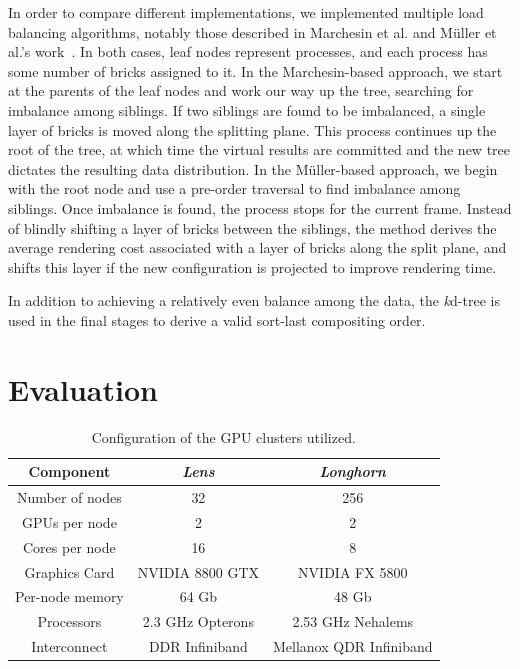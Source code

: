 In order to compare different implementations, we implemented multiple
load balancing algorithms, notably those described in Marchesin et al.
and M\"uller et al.'s work~\cite{Marchesin:2006:DynamicLB,
Mueller:2006:ParallelVRen}.  In both cases, leaf nodes represent
processes, and each process has some number of bricks assigned to
it.  In the Marchesin-based approach, we start at the parents of the
leaf nodes and work our way up the tree, searching for imbalance among
siblings.  If two siblings are found to be imbalanced, a single layer
of bricks is moved along the splitting plane.  This process continues
up the root of the tree, at which time the virtual results are
committed and the new tree dictates the resulting data distribution.
In the M\"uller-based approach, we begin with the root node and use a
pre-order traversal to find imbalance among siblings.  Once imbalance
is found, the process stops for the current frame.  Instead of blindly
shifting a layer of bricks between the siblings, the method derives
the average rendering cost associated with a layer of bricks along
the split plane, and shifts this layer if the new configuration is
projected to improve rendering time.

In addition to achieving a relatively even balance among the data, the
\emph{k}d-tree is used in the final stages to derive a valid sort-last
compositing order.

\section{Evaluation}
\label{sec:eval}

\begin{table}
	\begin{tabular}{|c|c|c|}\hline
	\textbf{Component} & \textit{Lens} & \textit{Longhorn}\\\hline
	Number of nodes & 32 & 256\\\hline
	GPUs per node & 2 & 2\\\hline
	Cores per node & 16 & 8\\\hline
	Graphics Card & NVIDIA 8800 GTX & NVIDIA FX 5800\\\hline
	Per-node memory & 64 Gb & 48 Gb\\\hline
	Processors & 2.3 GHz Opterons & 2.53 GHz Nehalems\\\hline
	Interconnect & DDR Infiniband & Mellanox QDR Infiniband\\\hline
	\end{tabular}
	\caption{Configuration of the GPU clusters utilized.}
	\label{tbl:clusters}
\end{table}

